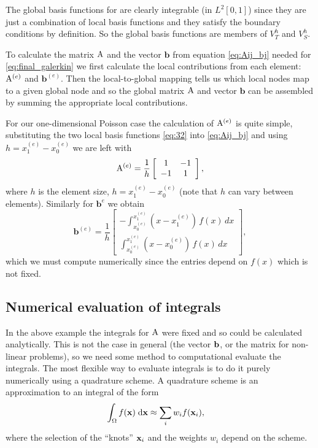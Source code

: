The global basis functions for are clearly integrable (\ie in $L^2[0,1]$) since they are just a combination of local basis functions and they satisfy the boundary conditions by definition.
So the global basis functions are members of $V_T^h$ and $V_S^h$.

To calculate the matrix $\mathrm{A}$ and the vector $\mathbf{b}$ from equation \eqref{eq:Aij_bj} needed for \eqref{eq:final_galerkin} we first calculate the local contributions from each element: $\mathrm{A}^{(e)}$ and $\mathbf{b}^{(e)}$.
Then the local-to-global mapping tells us which local nodes map to a given global node and so the global matrix $\mathrm{A}$ and vector $\mathbf{b}$ can be assembled by summing the appropriate local contributions.

For our one-dimensional Poisson case the calculation of $\mathrm{A}^{(e)}$ is quite
simple, substituting the two local basis functions \eqref{eq:32} into
\eqref{eq:Aij_bj} and using $h=x_{1}^{(e)}-x_{0}^{(e)}$ we are left with
\begin{equation}
  \mathrm{A}^{(e)} = \dfrac{1}{h}
  \left[
    \begin{array}{cc}
      1 & -1 \\ -1 & 1
    \end{array}
  \right],
\end{equation}
where $h$ is the element size, $h = x_{1}^{(e)}-x_{0}^{(e)}$ (note that $h$ can vary between elements).
Similarly for $\mathbf{b}^{{e}}$ we obtain
\begin{equation}
  \mathbf{b}^{(e)}=\dfrac{1}{h}\left[
    \begin{array}{c}
      -\int_{x_{0}^{(e)}}^{x_{1}^{(e)}}(x-x_{1}^{(e)})\, f(x)\, dx\\
      \int_{x_{0}^{(e)}}^{x_{1}^{(e)}}(x-x_{0}^{(e)})\, f(x)\, dx
    \end{array}\right],
\end{equation}
which we must compute numerically since the entries depend on $f(x)$ which is not fixed.



\subsection{Numerical evaluation of integrals}
\label{sec:numer-eval-integrals}

In the above example the integrals for $\mathrm{A}$ were fixed and so could be calculated analytically.
This is not the case in general (\eg the vector ${\mathbf{b}}$, or the matrix for non-linear problems), so we need some method to computational evaluate the integrals.
The most flexible way to evaluate integrals is to do it purely numerically using a quadrature scheme.
A quadrature scheme is an approximation to an integral of the form
\begin{equation}
  \begin{aligned}
    {\int_{\Omega} f(\mathbf{x}) {\; \text{d}}\mathbf{x}} &\approx  \sum_i w_i f(\mathbf{x}_i),
  \end{aligned}
\end{equation}
where the selection of the ``knots'' $\mathbf{x}_i$ and the weights $w_i$ depend on the scheme.

